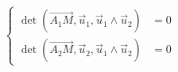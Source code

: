 \begin{equation*}
 \left\lbrace 
\begin{aligned}
 \det(\overrightarrow{A_1M},\overrightarrow u _1, \overrightarrow u _1 \wedge \overrightarrow u _2) &=0\\
 \det(\overrightarrow{A_2M},\overrightarrow u _2, \overrightarrow u _1 \wedge \overrightarrow u _2) &=0
\end{aligned}
\right. 
\end{equation*}
